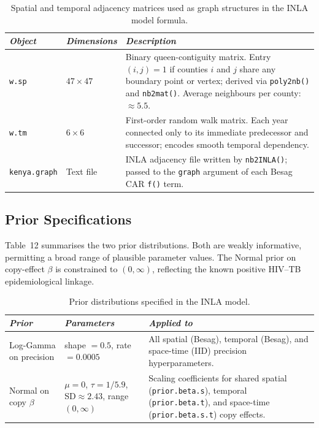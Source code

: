 \documentclass[11pt,a4paper]{article}
\newcommand{\code}[1]{\texttt{\small #1}}
\begin{document}
\begin{table}[H]
\caption{Spatial and temporal adjacency matrices used as graph structures in the INLA model formula.}
\renewcommand{\arraystretch}{1.10}
\scriptsize\begin{tabularx}{\textwidth}{@{}L{2.8cm}L{1.8cm}X@{}}
\toprule
\textit{Object} & \textit{Dimensions} & \textit{Description}\\
\midrule
\code{w.sp} & $47\times47$ & Binary queen-contiguity matrix. Entry $(i,j)=1$ if counties $i$ and $j$ share any boundary point or vertex; derived via \code{poly2nb()} and \code{nb2mat()}. Average neighbours per county: $\approx5.5$.\\
\code{w.tm} & $6\times6$   & First-order random walk matrix. Each year connected only to its immediate predecessor and successor; encodes smooth temporal dependency.\\
\code{kenya.graph} & Text file & INLA adjacency file written by \code{nb2INLA()}; passed to the \code{graph} argument of each Besag CAR \code{f()} term.\\
\bottomrule
\end{tabularx}
\renewcommand{\arraystretch}{1.10}
\end{table}

\subsection{Prior Specifications}

Table~12 summarises the two prior distributions. Both are weakly informative,
permitting a broad range of plausible parameter values. The Normal prior on
copy-effect $\beta$ is constrained to $(0,\infty)$, reflecting the known
positive HIV--TB epidemiological linkage.

\begin{table}[H]
\caption{Prior distributions specified in the INLA model.}
\renewcommand{\arraystretch}{1.10}
\scriptsize\begin{tabularx}{\textwidth}{@{}L{3.2cm}L{4.5cm}X@{}}
\toprule
\textit{Prior} & \textit{Parameters} & \textit{Applied to}\\
\midrule
Log-Gamma on precision
  & shape $=0.5$, rate $=0.0005$
  & All spatial (Besag), temporal (Besag), and space-time (IID) precision hyperparameters.\\
Normal on copy $\beta$
  & $\mu=0$, $\tau=1/5.9$, SD$\approx2.43$, range $(0,\infty)$
  & Scaling coefficients for shared spatial (\code{prior.beta.s}), temporal (\code{prior.beta.t}), and space-time (\code{prior.beta.s.t}) copy effects.\\
\bottomrule
\end{tabularx}
\renewcommand{\arraystretch}{1.10}
\end{table}
\end{document}
